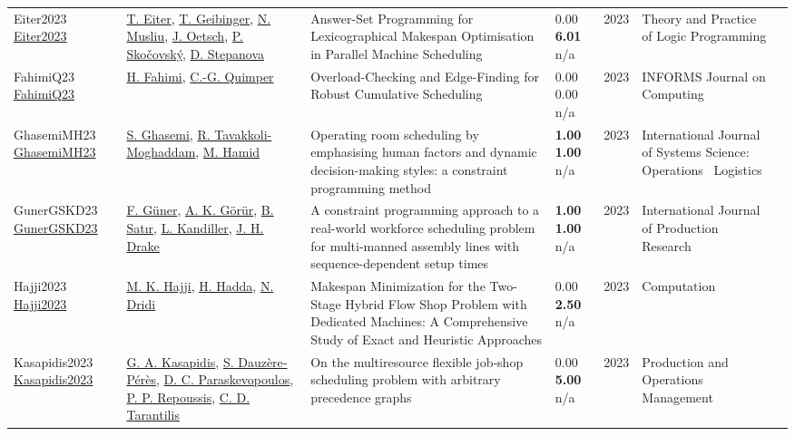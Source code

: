 {\begin{longtable}{p{3cm}p{5cm}p{10cm}p{1cm}rp{2.5cm}l}
Eiter2023 \href{http://dx.doi.org/10.1017/s1471068423000017}{Eiter2023} & \hyperref[auth:a1960]{T. Eiter}, \hyperref[auth:a77]{T. Geibinger}, \hyperref[auth:a45]{N. Musliu}, \hyperref[auth:a1961]{J. Oetsch}, \hyperref[auth:a1962]{P. Skočovský}, \hyperref[auth:a1963]{D. Stepanova} & \cellcolor{gold!20}Answer-Set Programming for Lexicographical Makespan Optimisation in Parallel Machine Scheduling & \noindent{}\textcolor{black!50}{0.00} \textbf{6.01} n/a & 2023 & Theory and Practice of Logic Programming & \cite{Eiter2023}\\
FahimiQ23 \href{http://dx.doi.org/10.1287/ijoc.2021.0138}{FahimiQ23} & \hyperref[auth:a122]{H. Fahimi}, \hyperref[auth:a37]{C.-G. Quimper} & Overload-Checking and Edge-Finding for Robust Cumulative Scheduling & \noindent{}\textcolor{black!50}{0.00} \textcolor{black!50}{0.00} n/a & 2023 & \cellcolor{red!20}INFORMS Journal on Computing & \cite{FahimiQ23}\\
GhasemiMH23 \href{http://dx.doi.org/10.1080/23302674.2023.2224509}{GhasemiMH23} & \hyperref[auth:a981]{S. Ghasemi}, \hyperref[auth:a430]{R. Tavakkoli-Moghaddam}, \hyperref[auth:a982]{M. Hamid} & Operating room scheduling by emphasising human factors and dynamic decision-making styles: a constraint programming method & \noindent{}\textbf{1.00} \textbf{1.00} n/a & 2023 & \cellcolor{red!20}International Journal of Systems Science: Operations \  Logistics & \cite{GhasemiMH23}\\
GunerGSKD23 \href{http://dx.doi.org/10.1080/00207543.2023.2226772}{GunerGSKD23} & \hyperref[auth:a1426]{F. G\"{u}ner}, \hyperref[auth:a1427]{A. K. G\"{o}r\"{u}r}, \hyperref[auth:a1428]{B. Satır}, \hyperref[auth:a1429]{L. Kandiller}, \hyperref[auth:a1430]{J. H. Drake} & A constraint programming approach to a real-world workforce scheduling problem for multi-manned assembly lines with sequence-dependent setup times & \noindent{}\textbf{1.00} \textbf{1.00} n/a & 2023 & \cellcolor{red!20}International Journal of Production Research & \cite{GunerGSKD23}\\
Hajji2023 \href{http://dx.doi.org/10.3390/computation11070137}{Hajji2023} & \hyperref[auth:a1537]{M. K. Hajji}, \hyperref[auth:a1538]{H. Hadda}, \hyperref[auth:a1539]{N. Dridi} & \cellcolor{gold!20}Makespan Minimization for the Two-Stage Hybrid Flow Shop Problem with Dedicated Machines: A Comprehensive Study of Exact and Heuristic Approaches & \noindent{}\textcolor{black!50}{0.00} \textbf{2.50} n/a & 2023 & Computation & \cite{Hajji2023}\\
Kasapidis2023 \href{http://dx.doi.org/10.1111/poms.13977}{Kasapidis2023} & \hyperref[auth:a1503]{G. A. Kasapidis}, \hyperref[auth:a1716]{S. Dauzère‐Pérès}, \hyperref[auth:a1504]{D. C. Paraskevopoulos}, \hyperref[auth:a1505]{P. P. Repoussis}, \hyperref[auth:a1506]{C. D. Tarantilis} & \cellcolor{gold!20}On the multiresource flexible job‐shop scheduling problem with arbitrary precedence graphs & \noindent{}\textcolor{black!50}{0.00} \textbf{5.00} n/a & 2023 & \cellcolor{red!20}Production and Operations Management & \cite{Kasapidis2023}\\

\end{longtable}}

